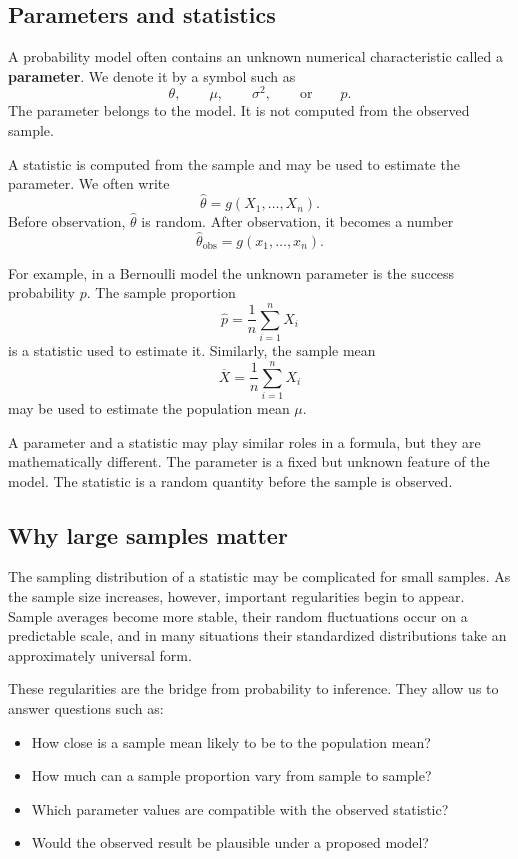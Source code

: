 \subsection*{Parameters and statistics}

A probability model often contains an unknown numerical characteristic called a
\textbf{parameter}. We denote it by a symbol such as
\[
\theta,
\qquad
\mu,
\qquad
\sigma^2,
\qquad
\text{or}
\qquad
p.
\]
The parameter belongs to the model. It is not computed from the observed sample.

A statistic is computed from the sample and may be used to estimate the
parameter. We often write
\[
\widehat\theta=g(X_1,\ldots,X_n).
\]
Before observation, \(\widehat\theta\) is random. After observation, it becomes a
number
\[
\widehat\theta_{\mathrm{obs}}=g(x_1,\ldots,x_n).
\]

For example, in a Bernoulli model the unknown parameter is the success
probability \(p\). The sample proportion
\[
\widehat p=\frac1n\sum_{i=1}^nX_i
\]
is a statistic used to estimate it. Similarly, the sample mean
\[
\overline X=\frac1n\sum_{i=1}^nX_i
\]
may be used to estimate the population mean \(\mu\).

\begin{remarkbox}
A parameter and a statistic may play similar roles in a formula, but they are
mathematically different. The parameter is a fixed but unknown feature of the
model. The statistic is a random quantity before the sample is observed.
\end{remarkbox}

\subsection*{Why large samples matter}

The sampling distribution of a statistic may be complicated for small samples.
As the sample size increases, however, important regularities begin to appear.
Sample averages become more stable, their random fluctuations occur on a
predictable scale, and in many situations their standardized distributions take
an approximately universal form.

These regularities are the bridge from probability to inference. They allow us
to answer questions such as:

\begin{itemize}
    \item How close is a sample mean likely to be to the population mean?
    \item How much can a sample proportion vary from sample to sample?
    \item Which parameter values are compatible with the observed statistic?
    \item Would the observed result be plausible under a proposed model?
\end{itemize}

